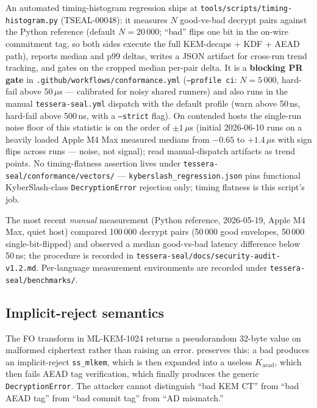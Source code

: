 An automated timing-histogram regression ships at \texttt{tools/scripts/timing-histogram.py}
(TSEAL-00048): it measures $N$ good-vs-bad decrypt pairs against the Python reference (default
$N = 20\,000$; ``bad'' flips one bit in the on-wire commitment tag, so both sides execute the full
KEM-decaps + KDF + AEAD path), reports median and p99 deltas, writes a JSON artifact for cross-run
trend tracking, and gates on the cropped median per-pair delta. It is a \textbf{blocking PR gate} in
\texttt{.github/workflows/conformance.yml} (\texttt{--profile ci}: $N = 5\,000$, hard-fail above
50\,$\mu$s --- calibrated for noisy shared runners) and also runs in the manual
\texttt{tessera-seal.yml} dispatch with the default profile (warn above 50\,ns, hard-fail above
500\,ns, with a \texttt{--strict} flag). On contended hosts the single-run noise floor of this
statistic is on the order of $\pm 1\,\mu$s (initial 2026-06-10 runs on a heavily loaded Apple M4 Max
measured medians from $-0.65$ to $+1.4\,\mu$s with sign flips across runs --- noise, not signal);
read manual-dispatch artifacts as trend points. No timing-flatness assertion lives under
\texttt{tessera-seal/conformance/vectors/} --- \texttt{kyberslash\_regression.json} pins functional
KyberSlash-class \texttt{DecryptionError} rejection only; timing flatness is this script's job.

The most recent \emph{manual} measurement (Python reference, 2026-05-19, Apple M4 Max, quiet host)
compared 100\,000 decrypt pairs (50\,000 good envelopes, 50\,000 single-bit-flipped) and observed a
median good-vs-bad latency difference below 50\,ns; the procedure is recorded in
\texttt{tessera-seal/docs/security-audit-v1.2.md}. Per-language measurement environments are
recorded under \texttt{tessera-seal/benchmarks/}.

\subsection{Implicit-reject semantics}

The FO transform in ML-KEM-1024 \citep{fips203,hofheinz2017fo} returns a pseudorandom 32-byte value on malformed ciphertext rather than raising an error. \pqcrypt{} preserves this: a bad  produces an implicit-reject \texttt{ss\_mlkem}, which is then expanded into a useless $K_{\mathrm{aead}}$, which then fails AEAD tag verification, which finally produces the generic \texttt{DecryptionError}. The attacker cannot distinguish ``bad KEM CT'' from ``bad AEAD tag'' from ``bad commit tag'' from ``AD mismatch.''
